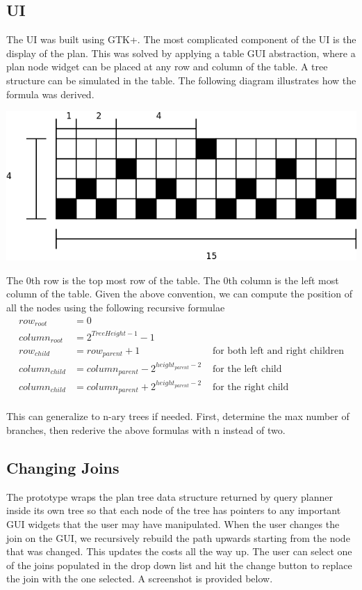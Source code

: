 \documentclass[letterpaper,10pt]{article}
\begin{document}
\subsection{UI}
The UI was built using GTK+. The most complicated component of the UI is the
display of the plan. This was solved by applying a table GUI abstraction, where
a plan node widget can be placed at any row and column of the table. A tree
structure can be simulated in the table. The following diagram illustrates how
the formula was derived.

\includegraphics[scale=0.5]{table-derivation.png}

The 0th row is the top most row of the table. The 0th column is the left most
column of the table. Given the above convention, we can compute the position of
all the nodes using the following recursive formulae \\
\begin{align*}
	row_{root} & = 0 \\
	column_{root} & = 2^{TreeHeight-1}-1 \\
	row_{child} & = row_{parent} + 1 & \mbox { for both left and right children}\\
	column_{child} & = column_{parent} - 2^{height_{parent}-2} & \mbox { for the left child} \\
	column_{child} & = column_{parent} + 2^{height_{parent}-2} & \mbox { for the right child} \\
\end{align*}

This can generalize to n-ary trees if needed. First, determine the max number of
branches, then rederive the above formulas with n instead of two.

\subsection{Changing Joins}
The prototype wraps the plan tree data structure returned by query planner inside
its own tree so that each node of the tree has pointers to any important GUI
widgets that the user may have manipulated. When the user changes the join on
the GUI, we recursively rebuild the path upwards starting from the node that was
changed. This updates the costs all the way up. The user can select one of the
joins populated in the drop down list and hit the change button to replace the
join with the one selected. A screenshot
is provided below.
\end{document}
